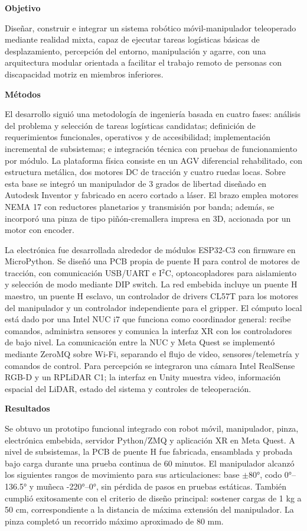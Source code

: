 \documentclass[12pt,letterpaper]{article}
\begin{document}
\textbf{Objetivo}

Diseñar, construir e integrar un sistema robótico móvil-manipulador teleoperado mediante realidad mixta, capaz de ejecutar tareas logísticas básicas de desplazamiento, percepción del entorno, manipulación y agarre, con una arquitectura modular orientada a facilitar el trabajo remoto de personas con discapacidad motriz en miembros inferiores.

\textbf{Métodos}

El desarrollo siguió una metodología de ingeniería basada en cuatro fases: análisis del problema y selección de tareas logísticas candidatas; definición de requerimientos funcionales, operativos y de accesibilidad; implementación incremental de subsistemas; e integración técnica con pruebas de funcionamiento por módulo. La plataforma física consiste en un AGV diferencial rehabilitado, con estructura metálica, dos motores DC de tracción y cuatro ruedas locas. Sobre esta base se integró un manipulador de 3 grados de libertad diseñado en Autodesk Inventor y fabricado en acero cortado a láser. El brazo emplea motores NEMA 17 con reductores planetarios y transmisión por banda; además, se incorporó una pinza de tipo piñón-cremallera impresa en 3D, accionada por un motor con encoder.

La electrónica fue desarrollada alrededor de módulos ESP32-C3 con firmware en MicroPython. Se diseñó una PCB propia de puente H para control de motores de tracción, con comunicación USB/UART e I$^2$C, optoacopladores para aislamiento y selección de modo mediante DIP switch. La red embebida incluye un puente H maestro, un puente H esclavo, un controlador de drivers CL57T para los motores del manipulador y un controlador independiente para el gripper. El cómputo local está dado por una Intel NUC i7 que funciona como coordinador general: recibe comandos, administra sensores y comunica la interfaz XR con los controladores de bajo nivel. La comunicación entre la NUC y Meta Quest se implementó mediante ZeroMQ sobre Wi-Fi, separando el flujo de video, sensores/telemetría y comandos de control. Para percepción se integraron una cámara Intel RealSense RGB-D y un RPLiDAR C1; la interfaz en Unity muestra video, información espacial del LiDAR, estado del sistema y controles de teleoperación.

\textbf{Resultados}

Se obtuvo un prototipo funcional integrado con robot móvil, manipulador, pinza, electrónica embebida, servidor Python/ZMQ y aplicación XR en Meta Quest. A nivel de subsistemas, la PCB de puente H fue fabricada, ensamblada y probada bajo carga durante una prueba continua de 60 minutos. El manipulador alcanzó los siguientes rangos de movimiento para sus articulaciones: base $\pm$80°, codo 0°--136.5° y muñeca -220°--0°, sin pérdida de pasos en pruebas estáticas. También cumplió exitosamente con el criterio de diseño principal: sostener cargas de 1 kg a 50 cm, correspondiente a la distancia de máxima extensión del manipulador. La pinza completó un recorrido máximo aproximado de 80 mm.
\end{document}
